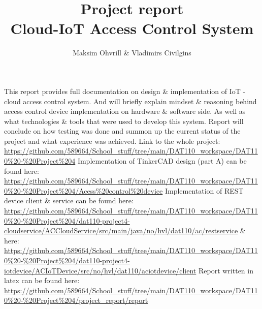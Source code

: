 \documentclass[11pt]{article}
\begin{document}
\title{Project report \\Cloud-IoT Access Control System}

\author{Maksim Ohvrill \& Vladimirs Civilgins}

\maketitle

\renewenvironment{abstract}
 {\small
  \begin{center}
  \bfseries \abstractname\vspace{-.5em}\vspace{0pt}
  \end{center}
  \list{}{%
    \setlength{\leftmargin}{20mm}%
    \setlength{\rightmargin}{\leftmargin}%
  }%
  \item\relax}
 {\endlist}

\begin{abstract}
This report provides full documentation on design \& implementation of
  IoT - cloud access control system. And will briefly explain mindset \& reasoning
  behind access control device implementation on hardware \& software side. As
  well as what technologies \& tools that were used to develop this system. Report
  will conclude on how testing was done and summon up the current status of the project 
  and what experience was achieved.
\newline\newline
Link to the whole project: \url{https://github.com/589664/School_stuff/tree/main/DAT110_workspace/DAT110%20-%20Project%204}
\newline\newline
Implementation of TinkerCAD design (part A) can be found here: \url{https://github.com/589664/School_stuff/tree/main/DAT110_workspace/DAT110%20-%20Project%204/Acess%20control%20device}
\newline\newline
Implementation of REST device client \& service can be found here: 
\newline\url{https://github.com/589664/School_stuff/tree/main/DAT110_workspace/DAT110%20-%20Project%204/dat110-project4-cloudservice/ACCloudService/src/main/java/no/hvl/dat110/ac/restservice}
\newline \& here:
\newline
\url{https://github.com/589664/School_stuff/tree/main/DAT110_workspace/DAT110%20-%20Project%204/dat110-project4-iotdevice/ACIoTDevice/src/no/hvl/dat110/aciotdevice/client}
\newline\newline
Report written in latex can be found here: \url{https://github.com/589664/School_stuff/tree/main/DAT110_workspace/DAT110%20-%20Project%204/project_report/report}


\end{abstract}
\end{document}

